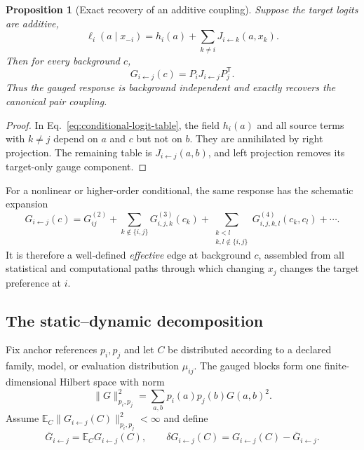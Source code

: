 \documentclass[10pt]{article}
\newcommand{\E}{\mathbb E}
\newtheorem{proposition}[theorem]{Proposition}
\theoremstyle{definition}
\theoremstyle{remark}
\newcommand{\BookSection}[1]{\subsection{#1}}
\begin{document}
\begin{proposition}[Exact recovery of an additive coupling]
\label{prop:exact-recovery}
Suppose the target logits are additive,
\begin{equation}
\ell_i(a\mid x_{-i})
=h_i(a)+\sum_{k\ne i}J_{i\leftarrow k}(a,x_k).
\label{eq:additive-logits}
\end{equation}
Then for every background $c$,
\begin{equation}
G_{i\leftarrow j}(c)
=P_iJ_{i\leftarrow j}P_j^{\mathsf T}.
\label{eq:exact-recovery}
\end{equation}
Thus the gauged response is background independent and exactly recovers the canonical pair
coupling.
\end{proposition}

\begin{proof}
In Eq.~\ref{eq:conditional-logit-table}, the field $h_i(a)$ and all source terms with $k\ne j$
depend on $a$ and $c$ but not on $b$.  They are annihilated by right projection.  The remaining
table is $J_{i\leftarrow j}(a,b)$, and left projection removes its target-only gauge component.
\end{proof}

For a nonlinear or higher-order conditional, the same response has the schematic expansion
\begin{equation}
G_{i\leftarrow j}(c)
=G_{ij}^{(2)}
+\sum_{k\notin\{i,j\}}G_{i,j,k}^{(3)}(c_k)
+\sum_{\substack{k<l\\k,l\notin\{i,j\}}}G_{i,j,k,l}^{(4)}(c_k,c_l)+\cdots.
\label{eq:response-order-mixture}
\end{equation}
It is therefore a well-defined \emph{effective} edge at background $c$, assembled from all
statistical and computational paths through which changing
$x_j$ changes the target preference at $i$.

\BookSection{The static--dynamic decomposition}

Fix anchor references $p_i,p_j$ and let $C$ be distributed according to a declared family, model,
or evaluation distribution $\mu_{ij}$.  The gauged blocks form one finite-dimensional Hilbert
space with norm
\begin{equation}
\|G\|_{p_i,p_j}^2
=\sum_{a,b}p_i(a)p_j(b)G(a,b)^2.
\label{eq:weighted-block-norm}
\end{equation}
Assume $\E_C\|G_{i\leftarrow j}(C)\|_{p_i,p_j}^2<\infty$ and define
\begin{equation}
\overline G_{i\leftarrow j}=\E_CG_{i\leftarrow j}(C),
\qquad
\delta G_{i\leftarrow j}(C)
=G_{i\leftarrow j}(C)-\overline G_{i\leftarrow j}.
\label{eq:static-dynamic-split}
\end{equation}
\end{document}
